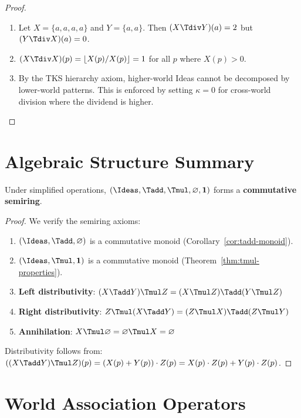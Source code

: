 \begin{proof}
\begin{enumerate}
  \item Let $X = \{a, a, a, a\}$ and $Y = \{a, a\}$. Then $(X \Tdiv Y)(a) = 2$ but $(Y \Tdiv X)(a) = 0$.

  \item $(X \Tdiv X)(p) = \lfloor X(p) / X(p) \rfloor = 1$ for all $p$ where $X(p) > 0$.

  \item By the TKS hierarchy axiom, higher-world Ideas cannot be decomposed by lower-world patterns. This is enforced by setting $\kappa = 0$ for cross-world division where the dividend is higher.
\end{enumerate}
\end{proof}

\section{Algebraic Structure Summary}

\begin{theorem}
\label{thm:semiring}
Under simplified operations, $(\Ideas, \Tadd, \Tmul, \varnothing, \mathbf{1})$ forms a \textbf{commutative semiring}.
\end{theorem}

\begin{proof}
We verify the semiring axioms:
\begin{enumerate}
  \item $(\Ideas, \Tadd, \varnothing)$ is a commutative monoid (Corollary~\ref{cor:tadd-monoid}).
  \item $(\Ideas, \Tmul, \mathbf{1})$ is a commutative monoid (Theorem~\ref{thm:tmul-properties}).
  \item \textbf{Left distributivity}: $(X \Tadd Y) \Tmul Z = (X \Tmul Z) \Tadd (Y \Tmul Z)$
  \item \textbf{Right distributivity}: $Z \Tmul (X \Tadd Y) = (Z \Tmul X) \Tadd (Z \Tmul Y)$
  \item \textbf{Annihilation}: $X \Tmul \varnothing = \varnothing \Tmul X = \varnothing$
\end{enumerate}
Distributivity follows from: $((X \Tadd Y) \Tmul Z)(p) = (X(p) + Y(p)) \cdot Z(p) = X(p) \cdot Z(p) + Y(p) \cdot Z(p)$.
\end{proof}

\section{World Association Operators}

